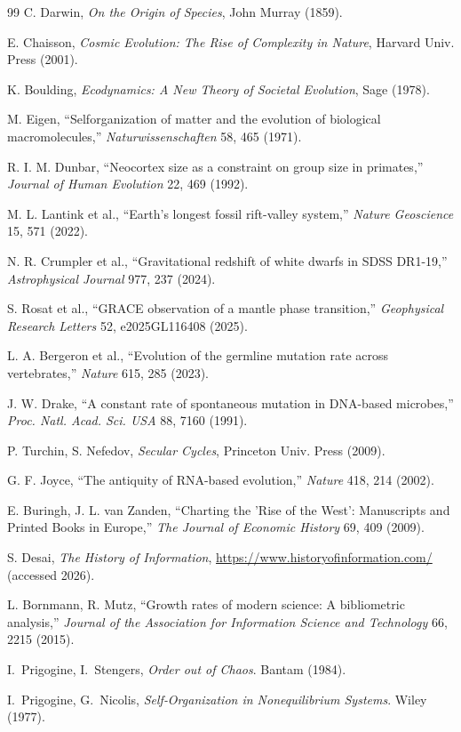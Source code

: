 \documentclass[12pt,a4paper]{article}
\theoremstyle{remark}
\begin{document}
\begin{thebibliography}{99}
		C. Darwin, \emph{On the Origin of Species}, John Murray (1859).
		
		E. Chaisson, \emph{Cosmic Evolution: The Rise of Complexity in Nature}, Harvard Univ. Press (2001).
		
		K. Boulding, \emph{Ecodynamics: A New Theory of Societal Evolution}, Sage (1978).
		
		M. Eigen, ``Selforganization of matter and the evolution of biological macromolecules,'' \emph{Naturwissenschaften} 58, 465 (1971).
		
		R. I. M. Dunbar, ``Neocortex size as a constraint on group size in primates,'' \emph{Journal of Human Evolution} 22, 469 (1992).
		
		M. L. Lantink et al., ``Earth's longest fossil rift-valley system,'' \emph{Nature Geoscience} 15, 571 (2022).
		
		N. R. Crumpler et al., ``Gravitational redshift of white dwarfs in SDSS DR1-19,'' \emph{Astrophysical Journal} 977, 237 (2024).
		
		S. Rosat et al., ``GRACE observation of a mantle phase transition,'' \emph{Geophysical Research Letters} 52, e2025GL116408 (2025).
		
		L. A. Bergeron et al., ``Evolution of the germline mutation rate across vertebrates,'' \emph{Nature} 615, 285 (2023).
		
		J. W. Drake, ``A constant rate of spontaneous mutation in DNA-based microbes,'' \textit{Proc. Natl. Acad. Sci. USA} 88, 7160 (1991).
		
		P. Turchin, S. Nefedov, \emph{Secular Cycles}, Princeton Univ. Press (2009).
		
		G. F. Joyce, ``The antiquity of RNA-based evolution,'' \textit{Nature} 418, 214 (2002).
		
		E. Buringh, J. L. van Zanden, ``Charting the 'Rise of the West': Manuscripts and Printed Books in Europe,'' \emph{The Journal of Economic History} 69, 409 (2009).
		
		S. Desai, \emph{The History of Information}, \url{https://www.historyofinformation.com/} (accessed 2026).
		
		L. Bornmann, R. Mutz, ``Growth rates of modern science: A bibliometric analysis,'' \emph{Journal of the Association for Information Science and Technology} 66, 2215 (2015).
		
		 I.~Prigogine, I.~Stengers, \emph{Order out of Chaos}. Bantam (1984).
		
		 I.~Prigogine, G.~Nicolis, \emph{Self‑Organization in Nonequilibrium Systems}. Wiley (1977).
		
	\end{thebibliography}
	
\end{document}
